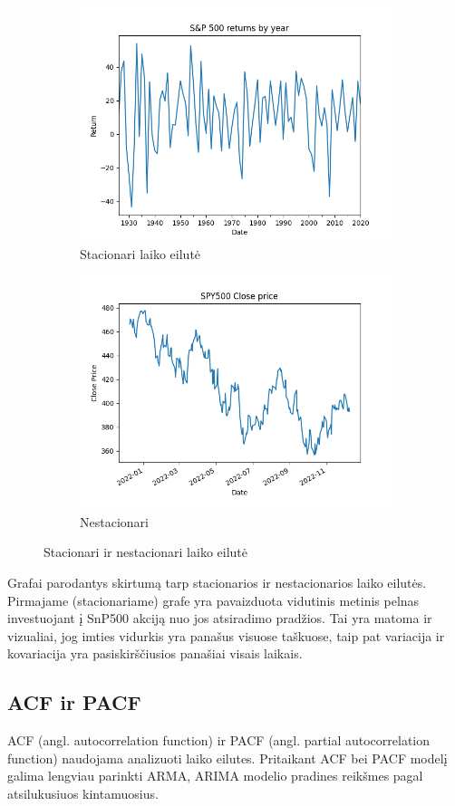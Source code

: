 \documentclass{VUMIFInfKursinis}
\begin{document}
\begin{figure}[H]
  \centering
  \begin{subfigure}{.5\textwidth}
    \centering
    \includegraphics[width=.6\linewidth]{img/history.png}
    \caption{Stacionari laiko eilutė}
    \label{fig:sub1}
  \end{subfigure}%
  \begin{subfigure}{.5\textwidth}
    \centering
    \includegraphics[width=.6\linewidth]{img/SPY_500_trend.png}
    \caption{Nestacionari}
    \label{fig:sub2}
  \end{subfigure}
  \caption{Stacionari ir nestacionari laiko eilutė}
  \label{fig:test}
\end{figure}

Grafai parodantys skirtumą tarp stacionarios ir nestacionarios laiko eilutės. Pirmajame (stacionariame) grafe yra pavaizduota vidutinis metinis pelnas
investuojant į SnP500 akciją nuo jos atsiradimo pradžios. Tai yra matoma ir vizualiai, jog imties vidurkis yra panašus visuose taškuose, taip pat
variacija ir kovariacija yra pasiskirščiusios panašiai visais laikais.
\subsection {ACF ir PACF}
ACF (angl. autocorrelation function) ir PACF (angl. partial autocorrelation function) naudojama analizuoti laiko eilutes. Pritaikant ACF bei PACF modelį 
galima lengviau parinkti ARMA, ARIMA modelio pradines reikšmes pagal atsilukusiuos kintamuosius.
\end{document}
